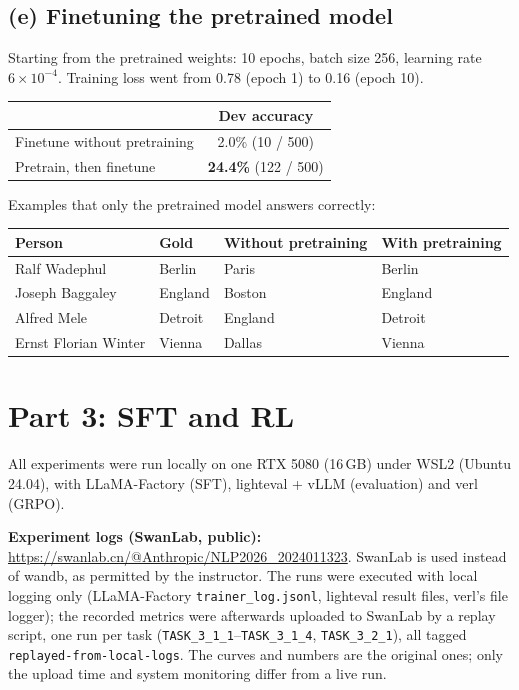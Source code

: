 \documentclass[11pt]{article}
\begin{document}
\subsection*{(e) Finetuning the pretrained model}

Starting from the pretrained weights: 10 epochs, batch size 256, learning rate
$6\times10^{-4}$. Training loss went from 0.78 (epoch 1) to 0.16 (epoch 10).

\begin{center}
\begin{tabular}{lc}
\toprule
 & Dev accuracy \\
\midrule
Finetune without pretraining & 2.0\% (10 / 500) \\
Pretrain, then finetune & \textbf{24.4\%} (122 / 500) \\
\bottomrule
\end{tabular}
\end{center}

Examples that only the pretrained model answers correctly:

\begin{center}
\begin{tabular}{llll}
\toprule
Person & Gold & Without pretraining & With pretraining \\
\midrule
Ralf Wadephul & Berlin & Paris & Berlin \\
Joseph Baggaley & England & Boston & England \\
Alfred Mele & Detroit & England & Detroit \\
Ernst Florian Winter & Vienna & Dallas & Vienna \\
\bottomrule
\end{tabular}
\end{center}


\section*{Part 3: SFT and RL}

All experiments were run locally on one RTX 5080 (16\,GB) under WSL2 (Ubuntu 24.04),
with LLaMA-Factory (SFT), lighteval + vLLM (evaluation) and verl (GRPO).

\textbf{Experiment logs (SwanLab, public):}
\url{https://swanlab.cn/@Anthropic/NLP2026_2024011323}.
SwanLab is used instead of wandb, as permitted by the instructor.
The runs were executed with local logging only (LLaMA-Factory \texttt{trainer\_log.jsonl},
lighteval result files, verl's file logger); the recorded metrics were afterwards
uploaded to SwanLab by a replay script, one run per task
(\texttt{TASK\_3\_1\_1}--\texttt{TASK\_3\_1\_4}, \texttt{TASK\_3\_2\_1}), all tagged
\texttt{replayed-from-local-logs}. The curves and numbers are the original ones;
only the upload time and system monitoring differ from a live run.
\end{document}

